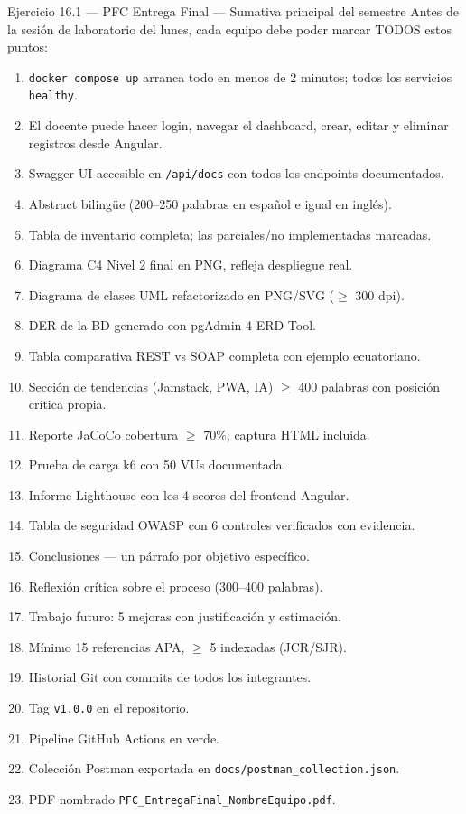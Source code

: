 \documentclass[11pt,a4paper,openany]{book}
\begin{document}
\begin{cajaejercicio}{Ejercicio 16.1 --- PFC Entrega Final --- Sumativa principal del semestre}
Antes de la sesión de laboratorio del lunes, cada equipo debe poder
marcar TODOS estos puntos:

\begin{enumerate}
\item \texttt{docker compose up} arranca todo en menos de 2 minutos;
todos los servicios \texttt{healthy}.
\item El docente puede hacer login, navegar el dashboard, crear,
editar y eliminar registros desde Angular.
\item Swagger UI accesible en \texttt{/api/docs} con todos los
endpoints documentados.
\item Abstract bilingüe (200--250 palabras en español e igual en
inglés).
\item Tabla de inventario completa; las parciales/no implementadas
marcadas.
\item Diagrama C4 Nivel 2 final en PNG, refleja despliegue real.
\item Diagrama de clases UML refactorizado en PNG/SVG ($\geq$ 300 dpi).
\item DER de la BD generado con pgAdmin 4 ERD Tool.
\item Tabla comparativa REST vs SOAP completa con ejemplo ecuatoriano.
\item Sección de tendencias (Jamstack, PWA, IA) $\geq$ 400 palabras
con posición crítica propia.
\item Reporte JaCoCo cobertura $\geq$ 70\%; captura HTML incluida.
\item Prueba de carga k6 con 50 VUs documentada.
\item Informe Lighthouse con los 4 scores del frontend Angular.
\item Tabla de seguridad OWASP con 6 controles verificados con
evidencia.
\item Conclusiones --- un párrafo por objetivo específico.
\item Reflexión crítica sobre el proceso (300--400 palabras).
\item Trabajo futuro: 5 mejoras con justificación y estimación.
\item Mínimo 15 referencias APA, $\geq$ 5 indexadas (JCR/SJR).
\item Historial Git con commits de todos los integrantes.
\item Tag \texttt{v1.0.0} en el repositorio.
\item Pipeline GitHub Actions en verde.
\item Colección Postman exportada en \texttt{docs/postman\_collection.json}.
\item PDF nombrado \texttt{PFC\_EntregaFinal\_NombreEquipo.pdf}.
\end{enumerate}


\end{cajaejercicio}
\end{document}
